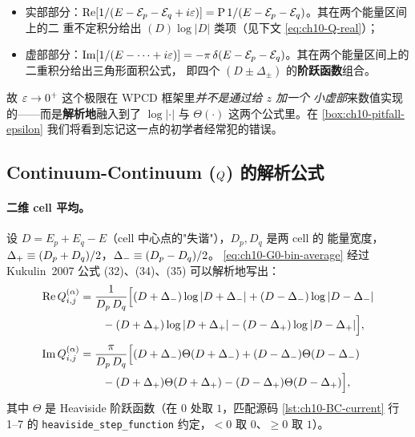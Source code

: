 \begin{itemize}
  \item 实部部分：\(\operatorname{Re}[1/(E - \mathcal{E}_p - \mathcal{E}_q + i\varepsilon)] =
        \mathrm{P}\,1/(E - \mathcal{E}_p - \mathcal{E}_q)\)。其在两个能量区间上的二
        重不定积分给出 \((D)\log|D|\) 类项（见下文 \cref{eq:ch10-Q-real}）；
  \item 虚部部分：\(\operatorname{Im}[1/(E - \cdots + i\varepsilon)] = -\pi\,\delta(E - \mathcal{E}_p
        - \mathcal{E}_q)\)。其在两个能量区间上的二重积分给出三角形面积公式，
        即四个 \((D \pm \Delta_\pm)\) 的\textbf{阶跃函数}组合。
\end{itemize}

故 \(\varepsilon \to 0^{+}\) 这个极限在 WPCD 框架里\emph{并不是通过给 \(z\) 加一个
小虚部}来数值实现的——而是\textbf{解析地}融入到了 \(\log|\cdot|\) 与
\(\Theta(\cdot)\) 这两个公式里。在
\cref{box:ch10-pitfall-epsilon} 我们将看到忘记这一点的初学者经常犯的错误。

\subsection{Continuum-Continuum (\(Q\)) 的解析公式}
\label{subsec:ch10-CC}

\paragraph{二维 cell 平均。}
设 \(D = E_p + E_q - E\)（cell 中心点的"失谐"），\(D_p, D_q\) 是两 cell 的
能量宽度，\(\Delta_{+} \equiv (D_p + D_q)/2\)，\(\Delta_{-} \equiv (D_p - D_q)/2\)。
\cref{eq:ch10-G0-bin-average} 经过 Kukulin~2007 \cite{Kukulin2007} 公式 (32)、(34)、(35)
可以解析地写出：
\begin{align}
\label{eq:ch10-Q-real}
\operatorname{Re} Q_{i,j}^{(\alpha)}
&= \frac{1}{D_p\, D_q}
\Bigl[
   (D + \Delta_{-})\log|D + \Delta_{-}|
+ (D - \Delta_{-})\log|D - \Delta_{-}|
\notag\\
&\qquad
- (D + \Delta_{+})\log|D + \Delta_{+}|
- (D - \Delta_{+})\log|D - \Delta_{+}|
\Bigr], \\[4pt]
\label{eq:ch10-Q-imag}
\operatorname{Im} Q_{i,j}^{(\alpha)}
&= \frac{\pi}{D_p\, D_q}
\Bigl[
   (D + \Delta_{-})\Theta(D + \Delta_{-})
+ (D - \Delta_{-})\Theta(D - \Delta_{-})
\notag\\
&\qquad
- (D + \Delta_{+})\Theta(D + \Delta_{+})
- (D - \Delta_{+})\Theta(D - \Delta_{+})
\Bigr],
\end{align}
其中 \(\Theta\) 是 Heaviside 阶跃函数（在 \(0\) 处取 \(1\)，匹配源码
\cref{lst:ch10-BC-current} 行 1--7 的 \texttt{heaviside\_step\_function}
约定，\(<0\) 取 \(0\)、\(\geq 0\) 取 \(1\)）。

